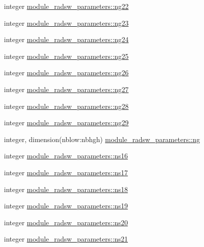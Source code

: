 \begin{DoxyCompactItemize}
\item 
integer \hyperlink{namespacemodule__radsw__parameters_a655c1f742fc97d58c32131e8a85cb6fd}{module\+\_\+radsw\+\_\+parameters\+::ng22}
\item 
integer \hyperlink{namespacemodule__radsw__parameters_a0c4f1d2f9438850994bcedb395d07f40}{module\+\_\+radsw\+\_\+parameters\+::ng23}
\item 
integer \hyperlink{namespacemodule__radsw__parameters_ae25ce9a47816b83c6c57440747f1975f}{module\+\_\+radsw\+\_\+parameters\+::ng24}
\item 
integer \hyperlink{namespacemodule__radsw__parameters_a3361783dd00dc40ee9f93c7f428c4e58}{module\+\_\+radsw\+\_\+parameters\+::ng25}
\item 
integer \hyperlink{namespacemodule__radsw__parameters_afcc02ded0358f9465eb9987226522266}{module\+\_\+radsw\+\_\+parameters\+::ng26}
\item 
integer \hyperlink{namespacemodule__radsw__parameters_a56a6dfca4ad450a5ccc910864780a971}{module\+\_\+radsw\+\_\+parameters\+::ng27}
\item 
integer \hyperlink{namespacemodule__radsw__parameters_aa2530abff6c981c3f3e70ef097f90ffc}{module\+\_\+radsw\+\_\+parameters\+::ng28}
\item 
integer \hyperlink{namespacemodule__radsw__parameters_aa53b1af0366b40653a6f0868858b9f3d}{module\+\_\+radsw\+\_\+parameters\+::ng29}
\item 
integer, dimension(nblow\+:nbhgh) \hyperlink{namespacemodule__radsw__parameters_aff9670cd3f5bef92ca998e491e28986e}{module\+\_\+radsw\+\_\+parameters\+::ng}
\item 
integer \hyperlink{namespacemodule__radsw__parameters_a3e6e310ecc531e2d0db52864468dc4a7}{module\+\_\+radsw\+\_\+parameters\+::ns16}
\item 
integer \hyperlink{namespacemodule__radsw__parameters_a08303e69e406f6bb2af252b1b7dff272}{module\+\_\+radsw\+\_\+parameters\+::ns17}
\item 
integer \hyperlink{namespacemodule__radsw__parameters_a142f7aa9f12272d721cfeae2855eec49}{module\+\_\+radsw\+\_\+parameters\+::ns18}
\item 
integer \hyperlink{namespacemodule__radsw__parameters_ab666e8da69b308ae5b09e187b8153518}{module\+\_\+radsw\+\_\+parameters\+::ns19}
\item 
integer \hyperlink{namespacemodule__radsw__parameters_ad63ddbb0abcaeda56220a624a62a7336}{module\+\_\+radsw\+\_\+parameters\+::ns20}
\item 
integer \hyperlink{namespacemodule__radsw__parameters_a63b1d13965acda2c131123f67fe456ea}{module\+\_\+radsw\+\_\+parameters\+::ns21}

\end{DoxyCompactItemize}
